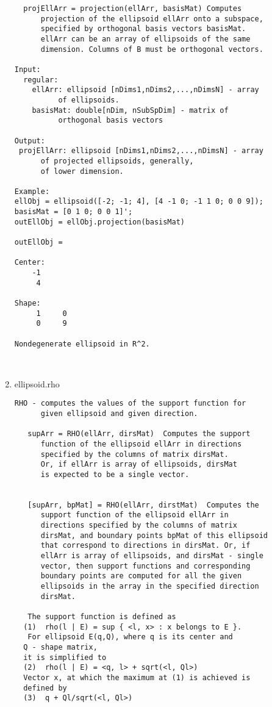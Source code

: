\begin{enumerate}
\begin{lstlisting}
  projEllArr = projection(ellArr, basisMat) Computes
      projection of the ellipsoid ellArr onto a subspace,
      specified by orthogonal basis vectors basisMat.
      ellArr can be an array of ellipsoids of the same
      dimension. Columns of B must be orthogonal vectors.

Input:
  regular:
    ellArr: ellipsoid [nDims1,nDims2,...,nDimsN] - array
          of ellipsoids.
    basisMat: double[nDim, nSubSpDim] - matrix of
          orthogonal basis vectors

Output:
 projEllArr: ellipsoid [nDims1,nDims2,...,nDimsN] - array
      of projected ellipsoids, generally,
      of lower dimension.

Example:
ellObj = ellipsoid([-2; -1; 4], [4 -1 0; -1 1 0; 0 0 9]);
basisMat = [0 1 0; 0 0 1]';
outEllObj = ellObj.projection(basisMat)

outEllObj =

Center:
    -1
     4

Shape:
     1     0
     0     9

Nondegenerate ellipsoid in R^2.



\end{lstlisting}
\fontfamily{\familydefault}
\selectfont
\item {ellipsoid.rho}
\selectfont
\begin{lstlisting}
RHO - computes the values of the support function for
      given ellipsoid and given direction.

   supArr = RHO(ellArr, dirsMat)  Computes the support
      function of the ellipsoid ellArr in directions
      specified by the columns of matrix dirsMat.
      Or, if ellArr is array of ellipsoids, dirsMat
      is expected to be a single vector.


   [supArr, bpMat] = RHO(ellArr, dirstMat)  Computes the
      support function of the ellipsoid ellArr in
      directions specified by the columns of matrix
      dirsMat, and boundary points bpMat of this ellipsoid
      that correspond to directions in dirsMat. Or, if
      ellArr is array of ellipsoids, and dirsMat - single
      vector, then support functions and corresponding
      boundary points are computed for all the given
      ellipsoids in the array in the specified direction
      dirsMat.

   The support function is defined as
  (1)  rho(l | E) = sup { <l, x> : x belongs to E }.
   For ellipsoid E(q,Q), where q is its center and
  Q - shape matrix,
  it is simplified to
  (2)  rho(l | E) = <q, l> + sqrt(<l, Ql>)
  Vector x, at which the maximum at (1) is achieved is
  defined by
  (3)  q + Ql/sqrt(<l, Ql>)


\end{lstlisting}
\end{enumerate}
